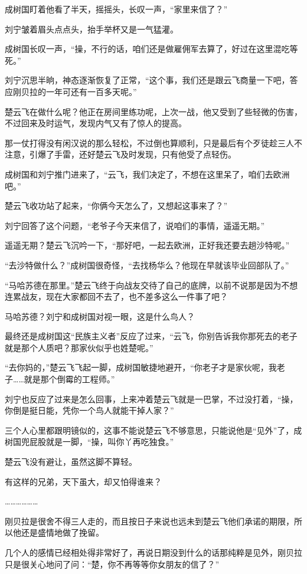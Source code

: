成树国盯着他看了半天，摇摇头，长叹一声，“家里来信了？”

刘宁皱着眉头点点头，抬手举杯又是一气猛灌。

成树国长叹一声，“操，不行的话，咱们还是做雇佣军去算了，好过在这里混吃等死。”

刘宁沉思半晌，神态逐渐恢复了正常，“这个事，我们还是跟云飞商量一下吧，答应刚贝拉的一年可还有一百多天呢。”

楚云飞在做什么呢？他正在房间里练功呢，上次一战，他又受到了些轻微的伤害，不过回来及时运气，发现内气又有了惊人的提高。

那一仗打得没有闲汉说的那么轻松，不过倒也算顺利，只是最后有个歹徒趁三人不注意，引爆了手雷，还好楚云飞及时发现，只有他受了点轻伤。

成树国和刘宁推门进来了，“云飞，我们决定了，不想在这里呆了，咱们去欧洲吧。”

楚云飞收功站了起来，“你俩今天怎么了，又想起这事来了？”

刘宁回答了这个问题，“老爷子今天来信了，说咱们的事情，遥遥无期。”

遥遥无期？楚云飞沉吟一下，“那好吧，一起去欧洲，正好我还要去趟沙特呢。”

“去沙特做什么？”成树国很奇怪，“去找杨华么？他现在早就该毕业回部队了。”

“马哈苏德在那里。”楚云飞终于向战友交待了自己的底牌，以前不说那是因为不想连累战友，现在大家都回不去了，也不差多这么一件事了吧？

马哈苏德？刘宁和成树国对视一眼，这是什么鸟人？

最终还是成树国这“民族主义者”反应了过来，“云飞，你别告诉我你那死去的老子就是那个人质吧？那家伙似乎也姓楚呢。”

“去你妈的，”楚云飞飞起一脚，成树国敏捷地避开，“你老子才是家伙呢，我老子……就是那个倒霉的工程师。”

刘宁也反应了过来是怎么回事，上来冲着楚云飞就是一巴掌，不过没打着，“操，你倒是挺日能，凭你一个鸟人就能干掉人家？”

三个人心里都跟明镜似的，这事不能说楚云飞不够意思，只能说他是“见外”了，成树国兜屁股就是一脚，“操，叫你丫再吃独食。”

楚云飞没有避让，虽然这脚不算轻。

有这样的兄弟，天下虽大，却又怕得谁来？

………………

刚贝拉是很舍不得三人走的，而且按日子来说也远未到楚云飞他们承诺的期限，所以他还是盛情地做了挽留。

几个人的感情已经相处得非常好了，再说日期没到什么的话那纯粹是见外，刚贝拉只是很关心地问了问：“楚，你不再等等你女朋友的信了？”

